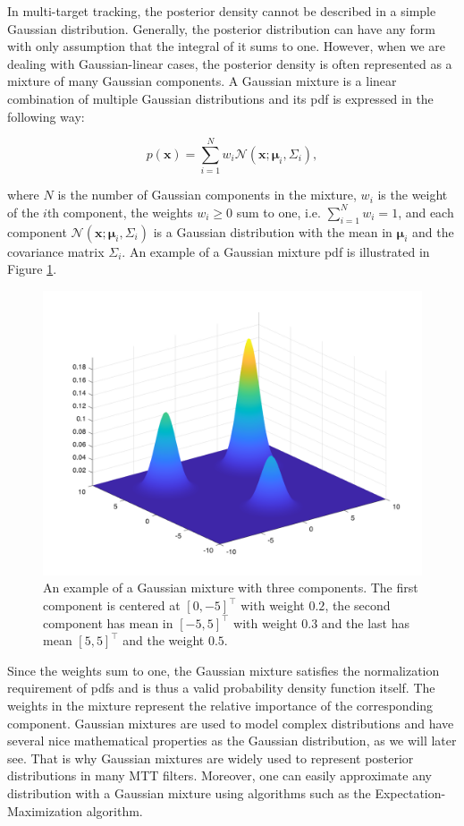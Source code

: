 In multi-target tracking, the posterior density cannot be described in a simple Gaussian distribution. Generally, the posterior distribution can have any form with only assumption that the integral of it sums to one. However, when we are dealing with Gaussian-linear cases, the posterior density is often represented as a mixture of many Gaussian components. A Gaussian mixture is a linear combination of multiple Gaussian distributions and its pdf is expressed in the following way:

\begin{equation}\label{eq:gaussian-mixture}
    p(\mathbf{x}) = \sum_{i=1}^N w_i \mathscr{N}\left(\mathbf{x}; \boldsymbol{\mu}_i, \Sigma_i\right),
\end{equation}

\noindent where $N$ is the number of Gaussian components in the mixture, $w_i$ is the weight of the $i$th component, the weights $w_i \geq 0$ sum to one, i.e. $\sum_{i=1}^N w_i = 1$, and each component $\mathscr{N}\left(\mathbf{x}; \boldsymbol{\mu}_i, \Sigma_i\right)$ is a Gaussian distribution with the mean in $\boldsymbol{\mu}_i$ and the covariance matrix $\Sigma_i$. An example of a Gaussian mixture pdf is illustrated in Figure \ref{fig:gaussian-mixture}.

\begin{figure}
\centering
  \includegraphics[width=.4\linewidth]{figures/gaussian-mixture.png}
  \caption{An example of a Gaussian mixture with three components. The first component is centered at $[0, -5]^\intercal$ with weight $0.2$, the second component has mean in $[-5, 5]^\intercal$ with weight $0.3$ and the last has mean $[5, 5]^\intercal$ and the weight $0.5$.}
  \label{fig:gaussian-mixture}
\end{figure}

Since the weights sum to one, the Gaussian mixture satisfies the normalization requirement of pdfs and is thus a valid probability density function itself. The weights in the mixture represent the relative importance of the corresponding component. Gaussian mixtures are used to model complex distributions and have several nice mathematical properties as the Gaussian distribution, as we will later see. That is why Gaussian mixtures are widely used to represent posterior distributions in many MTT filters. Moreover, one can easily approximate any distribution with a Gaussian mixture using algorithms such as the Expectation-Maximization algorithm.

